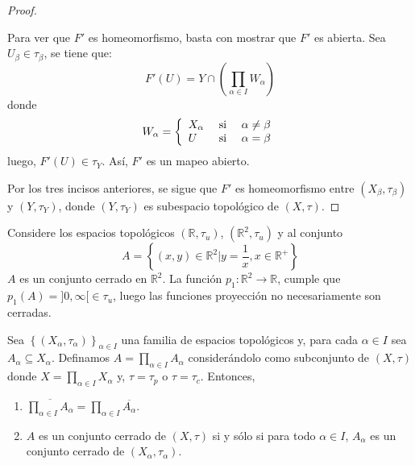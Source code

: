 \documentclass[12pt]{report}
\theoremstyle{largebreak}
\newcommand\cf[3]{\ensuremath{#1:#2\rightarrow#3}}
\newcommand{\Cls}[1]{\ensuremath{\overline{#1}}}
\begin{document}
\begin{proof}
\begin{enumerate}
            Para ver que $F'$ es homeomorfismo, basta con mostrar que $F'$ es abierta. Sea $U_\beta\in\tau_\beta$, se tiene que:
            \begin{equation*}
                F'(U)=Y\cap\left(\prod_{\alpha\in I}W_\alpha \right)
            \end{equation*}
            donde
            \begin{equation*}
                W_\alpha=\left\{
                    \begin{array}{lcr}
                        X_\alpha & \textup{ si } & \alpha\neq\beta\\
                        U & \textup{ si } & \alpha=\beta\\
                    \end{array}
                \right.
            \end{equation*}
            luego, $F'(U)\in\tau_Y$. Así, $F'$ es un mapeo abierto.
        \end{enumerate}
        Por los tres incisos anteriores, se sigue que $F'$ es homeomorfismo entre $(X_\beta,\tau_\beta)$ y $(Y,\tau_Y)$, donde $(Y,\tau_Y)$ es subespacio topológico de $(X,\tau)$.
    \end{proof}

    \begin{exa}
        Considere los espacios topológicos $(\mathbb{R},\tau_u)$, $(\mathbb{R}^2,\tau_u)$ y al conjunto
        \begin{equation*}
            A=\left\{(x,y)\in\mathbb{R}^2\Big|y=\frac{1}{x},x\in\mathbb{R}^+ \right\}
        \end{equation*}
        $A$ es un conjunto cerrado en $\mathbb{R}^2$. La función $\cf{p_1}{\mathbb{R}^2}{\mathbb{R}}$, cumple que $p_1(A)=]0,\infty[\in\tau_u$, luego las funciones proyección no necesariamente son cerradas.
    \end{exa}

    \begin{propo}
        Sea $\left\{(X_\alpha,\tau_\alpha) \right\}_{\alpha\in I}$ una familia de espacios topológicos y, para cada $\alpha\in I$ sea $A_\alpha\subseteq X_\alpha$. Definamos $A=\prod_{\alpha\in I}A_\alpha$ considerándolo como subconjunto de $(X,\tau)$ donde $X=\prod_{\alpha\in I}X_\alpha$ y, $\tau=\tau_p$ o $\tau=\tau_c$. Entonces,
        \begin{enumerate}
            \item $\Cls{\prod_{\alpha\in I}A_\alpha}=\prod_{\alpha\in I}\Cls{A_\alpha}$.
            \item $A$ es un conjunto cerrado de $(X,\tau)$ si y sólo si para todo $\alpha\in I$, $A_\alpha$ es un conjunto cerrado de $(X_\alpha,\tau_\alpha)$.
        \end{enumerate}
    \end{propo}
\end{document}

